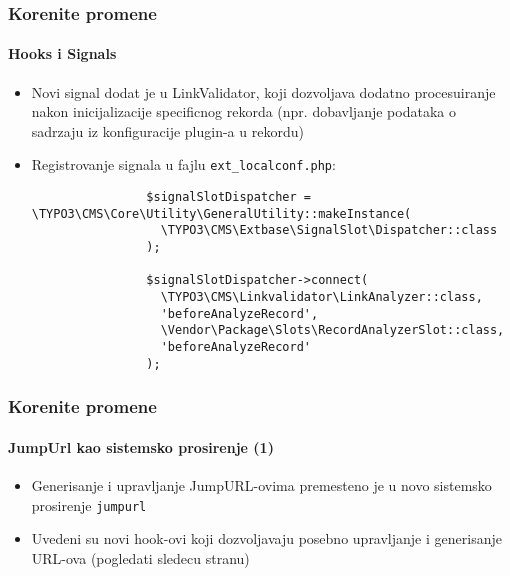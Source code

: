 \begin{frame}[fragile]
	\frametitle{Korenite promene}
	\framesubtitle{Hooks i Signals}

	\lstset{basicstyle=\tiny\ttfamily}

	\begin{itemize}

		\item Novi signal dodat je u LinkValidator, koji dozvoljava dodatno procesuiranje nakon inicijalizacije 
				specificnog rekorda \newline
			\small
				(npr. dobavljanje podataka o sadrzaju iz konfiguracije plugin-a u rekordu)
			\normalsize

		\item Registrovanje signala u fajlu \texttt{ext\_localconf.php}:

			\begin{lstlisting}
				$signalSlotDispatcher = \TYPO3\CMS\Core\Utility\GeneralUtility::makeInstance(
				  \TYPO3\CMS\Extbase\SignalSlot\Dispatcher::class
				);

				$signalSlotDispatcher->connect(
				  \TYPO3\CMS\Linkvalidator\LinkAnalyzer::class,
				  'beforeAnalyzeRecord',
				  \Vendor\Package\Slots\RecordAnalyzerSlot::class,
				  'beforeAnalyzeRecord'
				);
			\end{lstlisting}

	\end{itemize}

\end{frame}


\begin{frame}[fragile]
	\frametitle{Korenite promene}
	\framesubtitle{JumpUrl kao sistemsko prosirenje (1)}

	\lstset{basicstyle=\tiny\ttfamily}

	\begin{itemize}

		\item Generisanje i upravljanje JumpURL-ovima premesteno je u novo sistemsko prosirenje \texttt{jumpurl}

		\item Uvedeni su novi hook-ovi koji dozvoljavaju posebno upravljanje i generisanje URL-ova (pogledati sledecu stranu)

	\end{itemize}

	\breakingchange

\end{frame}

